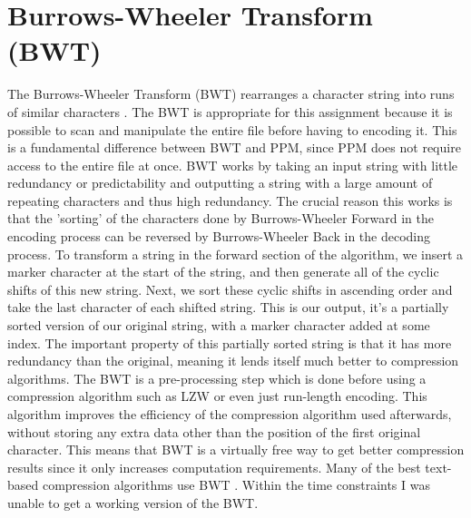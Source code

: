 \documentclass[a4paper, 11pt]{article}
\numberwithin{equation}{section}
\theoremstyle{plain}
\theoremstyle{definition}
\begin{document}
\section{Burrows-Wheeler Transform (BWT)}
The Burrows-Wheeler Transform (BWT) rearranges a character string into runs of similar characters \cite{burrows1994block}. 
The BWT is appropriate for this assignment because it is possible to scan and manipulate the entire file 
before having to encoding it. 
This is a fundamental difference between BWT and PPM, since PPM does not require access to the entire file 
at once. 
BWT works by taking an input string with little redundancy or predictability and outputting a string with 
a large amount of repeating characters and thus high redundancy. 
The crucial reason this works is that the 'sorting' of the characters done by Burrows-Wheeler Forward 
in the encoding process can be reversed by Burrows-Wheeler Back in the decoding process. 
To transform a string in the forward section of the algorithm, we insert a marker character at the start 
of the string, and then generate all of the cyclic shifts of this new string. 
Next, we sort these cyclic shifts in ascending order and take the last character of each shifted string. 
This is our output, it's a partially sorted version of our original string, with a marker character added 
at some index. 
The important property of this partially sorted string is that it has more redundancy than the original, 
meaning it lends itself much better to compression algorithms. 
The BWT is a pre-processing step which is done before using a compression algorithm such as LZW or 
even just run-length encoding. 
This algorithm improves the efficiency of the compression algorithm used afterwards, without storing 
any extra data other than the position of the first original character. 
This means that BWT is a virtually free way to get better compression results since it only increases 
computation requirements. 
Many of the best text-based compression algorithms use BWT \cite{TextBenchmark}. 
Within the time constraints I was unable to get a working version of the BWT. 
\end{document}
